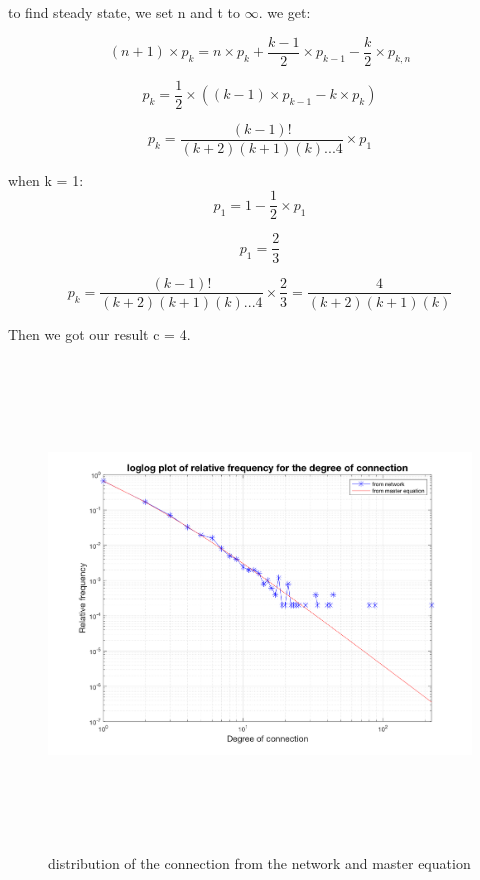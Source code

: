 \documentclass[12pt]{article}
\begin{document}
to find steady state, we set n and t to $\infty$. we get:

\begin{equation}
	(n+1)\times p_{k} = n \times p_{k} + \frac{k-1}{2} \times p_{k-1} - \frac{k}{2} \times p_{k,n}
\end{equation}

\begin{equation}
	p_{k} = \frac{1}{2} \times ((k-1)\times p_{k-1} - k \times p_{k})
\end{equation}

\begin{equation}
	p_{k} = \frac{(k-1)!}{(k+2)(k+1)(k)...4} \times p_{1} 
\end{equation}

when k = 1:
\begin{equation}
	p_{1} = 1 - \frac{1}{2} \times p_{1}
\end{equation}

\begin{equation}
	p_{1}  = \frac{2}{3}
\end{equation}

\begin{equation}
	p_{k} = \frac{(k-1)!}{(k+2)(k+1)(k)...4} \times \frac{2}{3} = \frac{4}{(k+2)(k+1)(k)}
\end{equation}

Then we got our result c = 4. 

\begin{figure}[H] %
\centering
\includegraphics[width = 16 cm, height = 13cm]{p_nw34.png}
\caption{distribution of the connection from the network and master equation}
\label{fig:plot3_4}
\end{figure}
\end{document}
